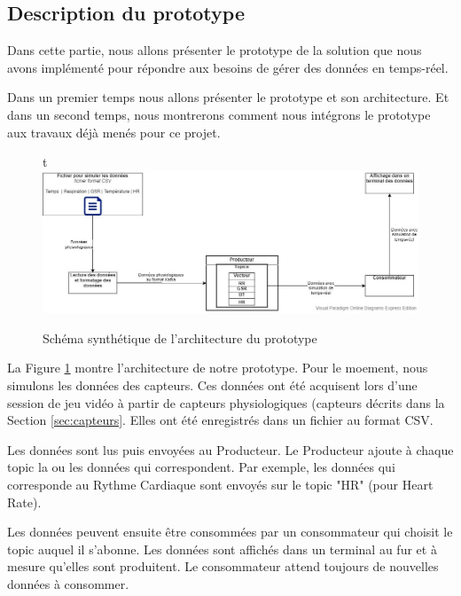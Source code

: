 \documentclass{article}
\begin{document}
	\subsection{Description du prototype}\label{sec:protodesc}
		Dans cette partie, nous allons présenter le prototype de la solution que nous avons implémenté pour répondre aux besoins de gérer des données en temps-réel.\par
		Dans un premier temps nous allons présenter le prototype et son architecture.
		Et dans un second temps, nous montrerons comment nous intégrons le prototype aux travaux déjà menés pour ce projet.\par
		\begin{figure}{t}
			\centering
			\hspace*{-1.7cm}
			\includegraphics[scale=0.75]{../include/schema-synt-prototype.jpg}
			\caption{Schéma synthétique de l'architecture du prototype}
			\label{fig:archiproto}
		\end{figure}
		La Figure \ref{fig:archiproto} montre l'architecture de notre prototype.
		Pour le moement, nous simulons les données des capteurs.
		Ces données ont été acquisent lors d'une session de jeu vidéo à partir de capteurs physiologiques (capteurs décrits dans la Section \ref{sec:capteurs}.
		Elles ont été enregistrés dans un fichier au format CSV.\par
		Les données sont lus puis envoyées au Producteur.
		Le Producteur ajoute à chaque topic la ou les données qui correspondent.
		Par exemple, les données qui corresponde au Rythme Cardiaque sont envoyés sur le topic "HR" (pour Heart Rate).\par
		Les données peuvent ensuite être consommées par un consommateur qui choisit le topic auquel il s'abonne.
		Les données sont affichés dans un terminal au fur et à mesure qu'elles sont produitent.
		Le consommateur attend toujours de nouvelles données à consommer.
\end{document}

